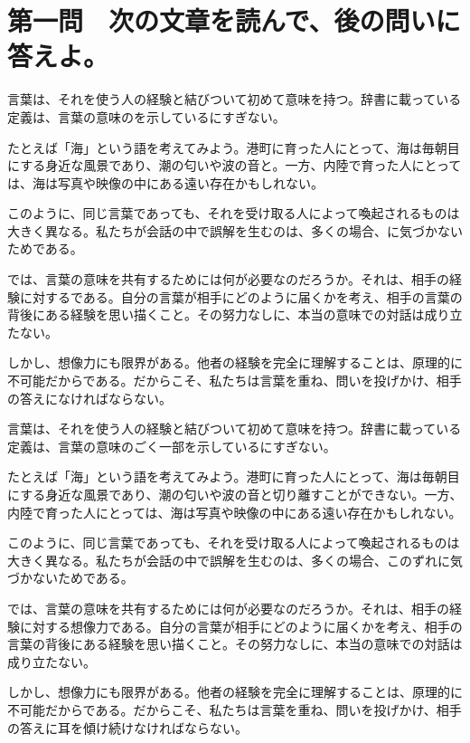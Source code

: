 \documentclass[tate,paper=b5,fontsize=10pt,twocolumn]{jlreq}
\begin{document}
\section*{第一問　次の文章を読んで、後の問いに答えよ。}

言葉は、それを使う人の経験と結びついて初めて意味を持つ。辞書に載っている定義は、言葉の意味のを示しているにすぎない。

たとえば「海」という語を考えてみよう。港町に育った人にとって、海は毎朝目にする身近な風景であり、潮の匂いや波の音と。一方、内陸で育った人にとっては、海は写真や映像の中にある遠い存在かもしれない。

このように、同じ言葉であっても、それを受け取る人によって喚起されるものは大きく異なる。私たちが会話の中で誤解を生むのは、多くの場合、に気づかないためである。

では、言葉の意味を共有するためには何が必要なのだろうか。それは、相手の経験に対するである。自分の言葉が相手にどのように届くかを考え、相手の言葉の背後にある経験を思い描くこと。その努力なしに、本当の意味での対話は成り立たない。

しかし、想像力にも限界がある。他者の経験を完全に理解することは、原理的に不可能だからである。だからこそ、私たちは言葉を重ね、問いを投げかけ、相手の答えになければならない。

言葉は、それを使う人の経験と結びついて初めて意味を持つ。辞書に載っている定義は、言葉の意味のごく一部を示しているにすぎない。

たとえば「海」という語を考えてみよう。港町に育った人にとって、海は毎朝目にする身近な風景であり、潮の匂いや波の音と切り離すことができない。一方、内陸で育った人にとっては、海は写真や映像の中にある遠い存在かもしれない。

このように、同じ言葉であっても、それを受け取る人によって喚起されるものは大きく異なる。私たちが会話の中で誤解を生むのは、多くの場合、このずれに気づかないためである。

では、言葉の意味を共有するためには何が必要なのだろうか。それは、相手の経験に対する想像力である。自分の言葉が相手にどのように届くかを考え、相手の言葉の背後にある経験を思い描くこと。その努力なしに、本当の意味での対話は成り立たない。

しかし、想像力にも限界がある。他者の経験を完全に理解することは、原理的に不可能だからである。だからこそ、私たちは言葉を重ね、問いを投げかけ、相手の答えに耳を傾け続けなければならない。
\end{document}
